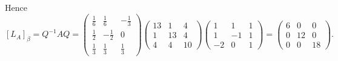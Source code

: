 \documentclass[12pt]{article}%
\begin{document}
Hence $$[L_A]_\beta=Q^{-1}AQ=\begin{pmatrix}\frac{1}{6}&\frac{1}{6}&-\frac{1}{3}\\\frac{1}{2}&-\frac{1}{2}&0\\\frac{1}{3}&\frac{1}{3}&\frac{1}{3}\end{pmatrix} \begin{pmatrix}13&1&4\\1&13&4\\4&4&10\end{pmatrix} \begin{pmatrix}1&1&1\\1&-1&1\\-2&0&1\end{pmatrix}=\begin{pmatrix}6&0&0\\0&12&0\\0&0&18\end{pmatrix}.$$
\end{document}
